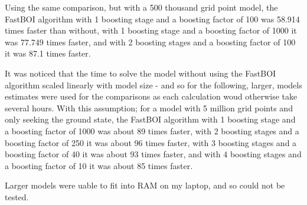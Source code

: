 Using the same comparison, but with a 500 thousand grid point model, the FastBOI algorithm with 1 boosting stage and a boosting factor of 100 was 58.914 times faster than without, with 1 boosting stage and a boosting factor of 1000 it was 77.749 times faster, and with 2 boosting stages and a boosting factor of 100 it was 87.1 times faster. 

It was noticed that the time to solve the model without using the FastBOI algorithm scaled linearly with model size - and so for the following, larger, models estimates were used for the comparisons as each calculation woud otherwise take several hours. With this assumption; for a model with 5 million grid points and only seeking the ground state, the FastBOI algorithm with 1 boosting stage and a boosting factor of 1000 was about 89 times faster, with 2 boosting stages and a boosting factor of 250 it was about 96 times faster, with 3 boosting stages and a boosting factor of 40 it was about 93 times faster, and with 4 boosting stages and a boosting factor of 10 it was about 85 times faster.

Larger models were uable to fit into RAM on my laptop, and so could not be tested.


%
%

